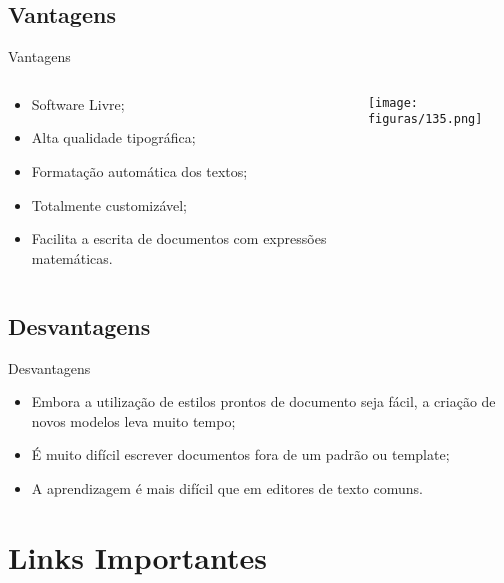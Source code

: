 \subsection{Vantagens}
\begin{frame}{Vantagens}
\begin{columns}[T]
    \begin{column}[T]{5cm}
        \begin{itemize}
            \item Software Livre;
            \item Alta qualidade tipográfica;
            \item Formatação automática dos textos;
            \item Totalmente customizável;
            \item Facilita a escrita de documentos com expressões matemáticas.
        \end{itemize}
    \end{column}

    \begin{column}[T]{5cm}
        \centering
        \texttt{[image: figuras/135.png]}
    \end{column}
\end{columns}
\end{frame}

\subsection{Desvantagens}

\begin{frame}{Desvantagens}
\begin{itemize}
    \item Embora a utilização de estilos prontos de documento seja fácil, a criação de novos modelos leva muito tempo;
    \item É muito difícil escrever documentos fora de um padrão ou template;
    \item A aprendizagem é mais difícil que em editores de texto comuns.
\end{itemize}
\end{frame}

\section{Links Importantes}
